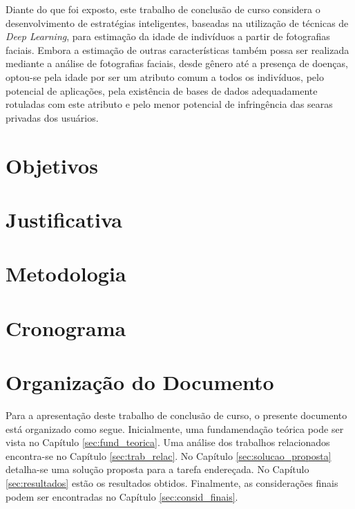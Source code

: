 Diante do que foi exposto, este trabalho de conclusão de curso considera o desenvolvimento de estratégias inteligentes, baseadas na utilização de técnicas de \emph{Deep Learning}, para estimação da idade de indivíduos a partir de fotografias faciais. Embora a estimação de outras características também possa ser realizada mediante a análise de fotografias faciais, desde gênero até a presença de doenças, optou-se pela idade por ser um atributo comum a todos os indivíduos, pelo potencial de aplicações, pela existência de bases de dados adequadamente rotuladas com este atributo e pelo menor potencial de infringência das searas privadas dos usuários.

\section{Objetivos}\label{sec:objetivo}


\section{Justificativa}\label{sec:just}


\section{Metodologia}\label{sec:metodo}


\section{Cronograma}\label{sec:crono}


\section{Organização do Documento}
Para a apresentação deste trabalho de conclusão de curso, o presente documento está organizado como segue. Inicialmente, uma fundamendação teórica pode ser vista no Capítulo \ref{sec:fund_teorica}. Uma análise dos trabalhos relacionados encontra-se no Capítulo \ref{sec:trab_relac}. No Capítulo \ref{sec:solucao_proposta} detalha-se uma solução proposta para a tarefa endereçada. No Capítulo \ref{sec:resultados} estão os resultados obtidos. Finalmente, as considerações finais podem ser encontradas no Capítulo \ref{sec:consid_finais}.

